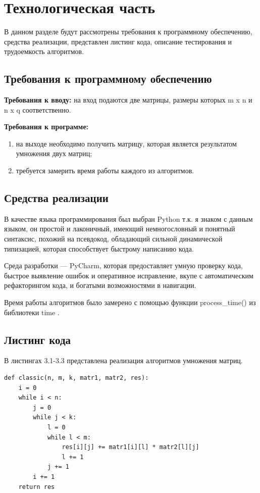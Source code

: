 \documentclass[12pt]{report}
\begin{document}
\chapter{Технологическая часть}
В данном разделе будут рассмотрены требования к программному обеспечению, средства реализации, представлен листинг кода, описание тестирования и трудоемкость алгоритмов.
\section{Требования к программному обеспечению}
\noindent\textbf{Требования к вводу:} на вход подаются две матрицы, размеры которых m x n и n x q соответственно.

\vspace{\baselineskip}
\noindent\textbf{Требования к программе:}
\begin{enumerate}
	\item на выходе
	необходимо получить матрицу, которая является результатом умножения двух матриц;
	\item требуется замерить время работы
	каждого из алгоритмов. 
\end{enumerate}
\section{Средства реализации}
В качестве языка программирования был выбран Python т.к. я знаком с данным языком, он простой и лаконичный, имеющий немногословный и понятный синтаксис, похожий на псевдокод, обладающий сильной динамической типизацией, которая способствует быстрому написанию кода. 

Среда разработки — PyCharm, которая предоставляет умную проверку кода, быстрое выявление ошибок и оперативное исправление, вкупе с автоматическим рефакторингом кода, и богатыми возможностями в навигации.  

Время  работы алгоритмов было замерено с помощью функции process\_time() из библиотеки time \cite{time}.

\newpage
\section{Листинг кода}

В листингах 3.1-3.3 представлена реализация алгоритмов умножения матриц.
\vspace{\baselineskip}

\begin{lstlisting}[label=some-code,caption=Стандартный алгоритм умножения матриц]
def classic(n, m, k, matr1, matr2, res):
	i = 0
	while i < n:
		j = 0
		while j < k:
			l = 0
			while l < m:
				res[i][j] += matr1[i][l] * matr2[l][j]
				l += 1
			j += 1
		i += 1
	return res
\end{lstlisting}
\end{document}
